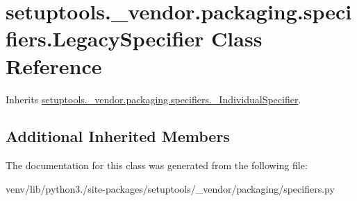 \hypertarget{classsetuptools_1_1__vendor_1_1packaging_1_1specifiers_1_1_legacy_specifier}{}\section{setuptools.\+\_\+vendor.\+packaging.\+specifiers.\+Legacy\+Specifier Class Reference}
\label{classsetuptools_1_1__vendor_1_1packaging_1_1specifiers_1_1_legacy_specifier}


Inherits \hyperlink{classsetuptools_1_1__vendor_1_1packaging_1_1specifiers_1_1___individual_specifier}{setuptools.\+\_\+vendor.\+packaging.\+specifiers.\+\_\+\+Individual\+Specifier}.

\subsection*{Additional Inherited Members}


The documentation for this class was generated from the following file\+:\begin{DoxyCompactItemize}
\item 
venv/lib/python3./site-\/packages/setuptools/\+\_\+vendor/packaging/specifiers.\+py\end{DoxyCompactItemize}
